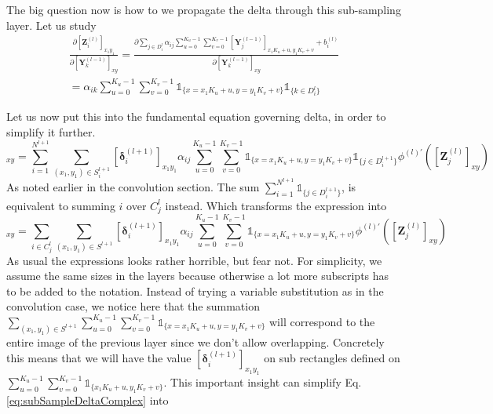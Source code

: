\documentclass[a4paper,10pt]{article}
\theoremstyle{definition}
\begin{document}
The big question now is how to we propagate the delta through this sub-sampling layer. Let us study
\begin{gather}
\frac{\partial [\pmb{Z}^{(l)}_{i}]_{x_1y_1}}{\partial [\pmb{Y}^{(l-1)}_k]_{xy}} = \frac{\partial \sum_{j \in D^l_i} \alpha_{ij} \sum_{u = 0}^{K_u - 1}\sum_{v = 0}^{K_v - 1} [\pmb{Y}^{(l-1)}_j]_{x_1K_u + u, y_1K_v + v} + b_i^{(l)}}{\partial  [\pmb{Y}^{(l-1)}_k]_{xy}} \\
= \alpha_{ik} \sum_{u = 0}^{K_u - 1}\sum_{v = 0}^{K_v - 1} \mathds{1}_{\{x = x_1K_u + u, y = y_1K_v + v\}}\mathds{1}_{\{k \in D^l_i\}}
\end{gather}

Let us now put this into the fundamental equation governing delta, in order to simplify it further.
\begin{equation}
	[\pmb{\delta}_j^{(l)}]_{xy} = \sum_{i = 1}^{N^{l+1}}\sum_{(x_1,y_1) \in S^{l+1}_i} [\pmb{\delta}^{(l+1)}_i]_{x_1y_1} \alpha_{ij} \sum_{u = 0}^{K_u - 1}\sum_{v = 0}^{K_v - 1} \mathds{1}_{\{x = x_1K_u + u, y = y_1K_v + v\}}\mathds{1}_{\{j \in D^{l+1}_i\}} \phi^{(l)'}([\pmb{Z}^{(l)}_{j}]_{xy})
\end{equation}
As noted earlier in the convolution section. The sum $\sum_{i = 1}^{N^{l+1}}\mathds{1}_{\{j \in D^{l+1}_i\}}$, is equivalent to summing $i$ over $C_j^{l}$ instead. Which transforms the expression into
\begin{equation}
	[\pmb{\delta}_j^{(l)}]_{xy} = \sum_{i \in C_j^{l}}\sum_{(x_1,y_1) \in S^{l+1}} [\pmb{\delta}^{(l+1)}_i]_{x_1y_1} \alpha_{ij} \sum_{u = 0}^{K_u - 1}\sum_{v = 0}^{K_v - 1} \mathds{1}_{\{x = x_1K_u + u, y = y_1K_v + v\}} \phi^{(l)'}([\pmb{Z}^{(l)}_{j}]_{xy})
	\label{eq:subSampleDeltaComplex}
\end{equation}
As usual the expressions looks rather horrible, but fear not. For simplicity, we assume the same sizes in the layers because otherwise a lot more subscripts has to be added to the notation. Instead of trying a variable substitution as in the convolution case, we notice here that the summation\\
$\sum_{(x_1,y_1) \in S^{l+1}}\sum_{u = 0}^{K_u - 1}\sum_{v = 0}^{K_v - 1}\mathds{1}_{\{x = x_1K_u + u, y = y_1K_v + v\}}$ will correspond to the entire image of the previous layer since we don't allow overlapping. Concretely this means that we will have the value $[\pmb{\delta}^{(l+1)}_i]_{x_1y_1}$ on sub rectangles defined on $\sum_{u = 0}^{K_u - 1}\sum_{v = 0}^{K_v - 1}\mathds{1}_{\{x_1K_u + u, y_1K_v + v\}}$. This important insight can simplify Eq. \ref{eq:subSampleDeltaComplex} into
\end{document}
